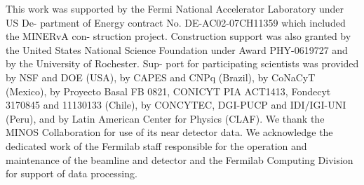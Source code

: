 \begin{acknowledgments}
This work was supported by the Fermi National Accelerator Laboratory under US De- partment of Energy contract No. DE-AC02-07CH11359 which included the MINERvA con- struction project. Construction support was also granted by the United States National Science Foundation under Award PHY-0619727 and by the University of Rochester. Sup- port for participating scientists was provided by NSF and DOE (USA), by CAPES and CNPq (Brazil), by CoNaCyT (Mexico), by Proyecto Basal FB 0821, CONICYT PIA ACT1413, Fondecyt 3170845 and 11130133 (Chile), by CONCYTEC, DGI-PUCP and IDI/IGI-UNI (Peru), and by Latin American Center for Physics (CLAF). We thank the MINOS Collaboration for use of its near detector data. We acknowledge the dedicated work of the Fermilab staff responsible for the operation and maintenance of the beamline and detector and the Fermilab Computing Division for support of data processing.

\end{acknowledgments}
